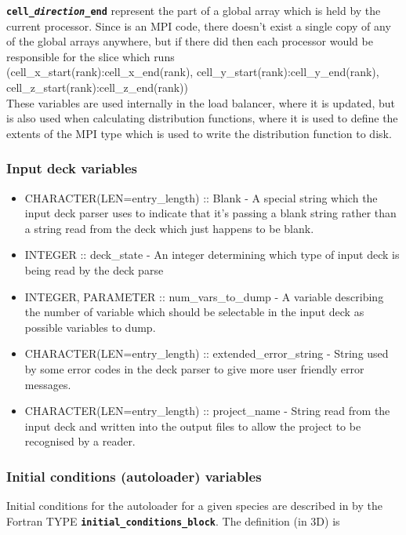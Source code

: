 \documentclass[12pt,a4paper]{article}
\newcommand{\inlinecode}[1]{{\color{warwickred} \bf\texttt{#1}}}
\newcommand{\EPOCH}{{\color{warwickdark}\fontfamily{phv}\selectfont{EPOCH}}}
\begin{document}
\inlinecode{cell\_{\it direction}\_end} represent the part of a global array
which is held by the current processor. Since {\EPOCH} is an MPI code, there
doesn't exist a single copy of any of the global arrays anywhere, but if there
did then each processor would be responsible for the slice which runs\\
(cell\_x\_start(rank):cell\_x\_end(rank),
cell\_y\_start(rank):cell\_y\_end(rank),
cell\_z\_start(rank):cell\_z\_end(rank))\\
These variables are used internally in the load balancer, where it is updated,
but is also used when calculating distribution functions, where it is used to
define the extents of the MPI type which is used to write the distribution
function to disk.

\subsubsection{Input deck variables}
\begin{itemize}
\item CHARACTER(LEN=entry\_length) :: Blank - A special string which the input
  deck parser uses to indicate that it's passing a blank string rather than a
  string read from the deck which just happens to be blank.
\item INTEGER :: deck\_state - An integer determining which type of input deck
  is being read by the deck parse
\item INTEGER, PARAMETER :: num\_vars\_to\_dump - A variable describing the
  number of variable which should be selectable in the input deck as possible
  variables to dump.
\item CHARACTER(LEN=entry\_length) :: extended\_error\_string - String used by
  some error codes in the deck parser to give more user friendly error
  messages.
\item CHARACTER(LEN=entry\_length) :: project\_name - String read from the
  input deck and written into the output files to allow the project to be
  recognised by a reader.
\end{itemize}

\subsubsection{Initial conditions (autoloader) variables}
Initial conditions for the autoloader for a given species are described in
{\EPOCH} by the Fortran TYPE \inlinecode{initial\_conditions\_block}. The
definition (in 3D) is
\end{document}
